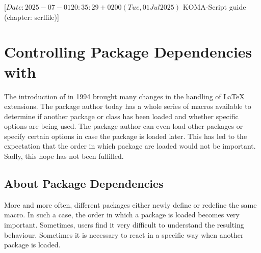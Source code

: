 %
%
%
%
%
%
%

                 [$Date: 2025-07-01 20:35:29 +0200 (Tue, 01 Jul 2025) $
                  KOMA-Script guide (chapter: scrlfile)]

\chapter{Controlling Package Dependencies with }
\BeginIndexGroup
{}

The introduction of \LaTeXe{} in 1994 brought many changes in the handling of
\LaTeX{} extensions. The package author today has a whole series of macros
available to determine if another package or class has been loaded and whether
specific options are being used. The package author can even load other
packages or specify certain options in case the package is loaded later. This
has led to the expectation that the order in which package are loaded would
not be important. Sadly, this hope has not been fulfilled.

\section{About Package Dependencies}
More and more often, different packages either newly define or redefine the
same macro. In such a case, the order in which a package is loaded becomes
very important. Sometimes, users find it very difficult to understand the
resulting behaviour. Sometimes it is necessary to react in a specific way when
another package is loaded.

